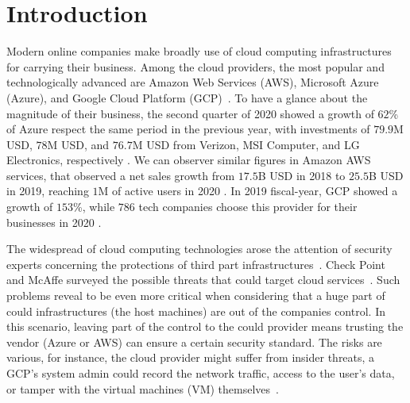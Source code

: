 \chapter{Introduction} %
\label{chp:introduction} 


Modern online companies make broadly use of cloud computing infrastructures for 
carrying their business.
Among the cloud providers, the most popular and technologically advanced 
are Amazon Web Services (AWS), Microsoft Azure (Azure), and Google Cloud 
Platform (GCP)~\citep{flexera_report}.
To have a glance about the magnitude of their business, the second quarter of 
2020 showed a growth of $62$\% of Azure respect the same period in the 
previous year, with investments of $79.9$M USD, $78$M 
USD, and $76.7$M USD from Verizon, MSI Computer, and LG Electronics, 
respectively \citep{azure_business}.
We can observer similar figures in Amazon AWS services, that observed a net 
sales growth from $17.5$B USD in 2018 to $25.5$B USD in 2019, reaching $1$M of 
active users in 2020 \citep{aws_business}.
In 2019 fiscal-year, GCP showed a growth of $153$\%, while $786$ tech companies 
choose this provider for their businesses in 2020 \citep{google_business}.

The widespread of cloud computing technologies arose the attention of security
experts concerning the protections of third part 
infrastructures~\citep{ryan2011cloud,sun2014data}.
Check Point and McAffe surveyed the possible threats that could target
cloud services~\citep{checkpoint_cloud,mcaffee_cloud}.
Such problems reveal to be even more critical when considering that a huge part 
of could infrastructures (\ie the host machines) are out of the companies 
control.
In this scenario, leaving part of the control to the could provider means 
trusting the vendor (\eg Azure or AWS) can ensure a certain security standard.
The risks are various, for instance, the cloud provider might suffer 
from insider threats, \eg a GCP's system admin could record the network 
traffic, access to the user's data, or tamper with the virtual machines (VM) 
themselves~\citep{insider_threat}.

